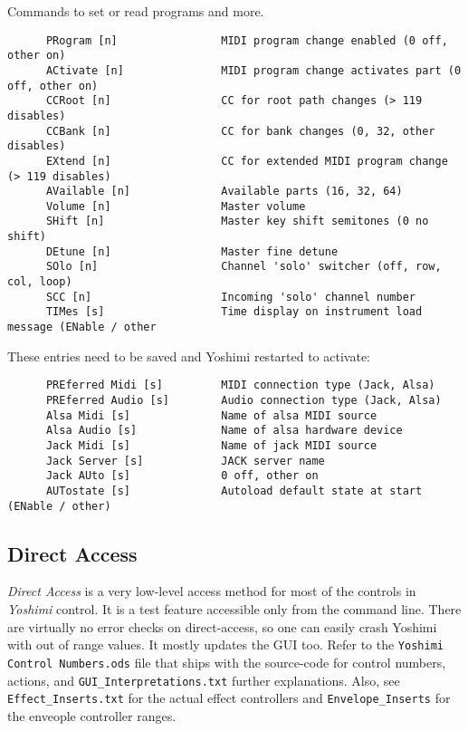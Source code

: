    Commands to set or read programs and more.

\begin{verbatim}
      PRogram [n]                MIDI program change enabled (0 off, other on)
      ACtivate [n]               MIDI program change activates part (0 off, other on)
      CCRoot [n]                 CC for root path changes (> 119 disables)
      CCBank [n]                 CC for bank changes (0, 32, other disables)
      EXtend [n]                 CC for extended MIDI program change (> 119 disables)
      AVailable [n]              Available parts (16, 32, 64)
      Volume [n]                 Master volume
      SHift [n]                  Master key shift semitones (0 no shift)
      DEtune [n]                 Master fine detune
      SOlo [n]                   Channel 'solo' switcher (off, row, col, loop)
      SCC [n]                    Incoming 'solo' channel number
      TIMes [s]                  Time display on instrument load message (ENable / other
\end{verbatim}

      These entries need to be saved and Yoshimi restarted to activate:

\begin{verbatim}
      PREferred Midi [s]         MIDI connection type (Jack, Alsa)
      PREferred Audio [s]        Audio connection type (Jack, Alsa)
      Alsa Midi [s]              Name of alsa MIDI source
      Alsa Audio [s]             Name of alsa hardware device
      Jack Midi [s]              Name of jack MIDI source
      Jack Server [s]            JACK server name
      Jack AUto [s]              0 off, other on
      AUTostate [s]              Autoload default state at start (ENable / other)
\end{verbatim}

\fi


\subsection{Direct Access}
\label{subsec:command_line_direct_access}

   \textsl{Direct Access} is a very low-level access method for most of the
   controls in \textsl{Yoshimi} control.
   It is a test feature accessible only from the command line.
   There are virtually no error checks on direct-access, so one can easily
   crash Yoshimi with out of range values.
   It mostly updates the GUI too.
   Refer to the \texttt{Yoshimi Control Numbers.ods} file that ships with the
   source-code
   for control numbers, actions, and \texttt{GUI\_Interpretations.txt}
   further explanations.
   Also, see \texttt{Effect\_Inserts.txt} for the actual effect controllers and
   \texttt{Envelope\_Inserts} for the enveople controller ranges.

